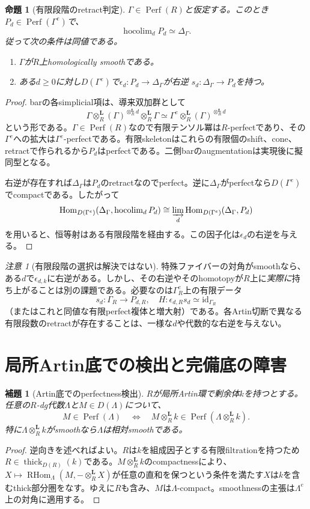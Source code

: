 \documentclass[a4paper,11pt]{ltjsarticle}
\newtheorem{lemma}[theorem]{補題}
\newtheorem{proposition}[theorem]{命題}
\theoremstyle{remark}
\newtheorem{remark}[theorem]{注意}
\newcommand{\Perf}{\operatorname{Perf}}
\newcommand{\RHom}{\operatorname{RHom}}
\newcommand{\thick}{\operatorname{thick}}
\newcommand{\otL}{\otimes^{\mathbf L}}
\begin{document}
\begin{proposition}[有限段階のretract判定]\label{prop:bar}
$\Gamma\in\Perf(R)$と仮定する。このとき$P_d\in\Perf(\Gamma^e)$で、
\[
 \operatorname{hocolim}_{d}P_d\simeq\Delta_\Gamma.
\]
従って次の条件は同値である。
\begin{enumerate}
\item $\Gamma$が$R$上homologically smoothである。
\item ある$d\ge0$に対し$D(\Gamma^e)$で$\epsilon_d:P_d\to\Delta_\Gamma$が右逆
$s_d:\Delta_\Gamma\to P_d$を持つ。
\end{enumerate}
\end{proposition}
\begin{proof}
barの各simplicial項は、導来双加群として
\[
 \Gamma\otL_R(\Gamma)^{\otL_R d}\otL_R\Gamma
 \simeq \Gamma^e\otL_R (\Gamma)^{\otL_R d}
\]
という形である。$\Gamma\in\Perf(R)$なので有限テンソル冪は$R$-perfectであり、その$\Gamma^e$への拡大は$\Gamma^e$-perfectである。有限skeletonはこれらの有限個のshift、cone、retractで作られるから$P_d$はperfectである。二側barのaugmentationは実現後に擬同型となる。

右逆が存在すれば$\Delta_\Gamma$は$P_d$のretractなのでperfect。逆に$\Delta_\Gamma$がperfectなら$D(\Gamma^e)$でcompactである。したがって
\[
 \operatorname{Hom}_{D(\Gamma^e)}
 (\Delta_\Gamma,\operatorname{hocolim}_d P_d)
 \cong \varinjlim_d\operatorname{Hom}_{D(\Gamma^e)}(\Delta_\Gamma,P_d)
\]
を用いると、恒等射はある有限段階を経由する。この因子化は$\epsilon_d$の右逆を与える。
\end{proof}

\begin{remark}[有限段階の選択は解決ではない]\label{rem:lifting}
特殊ファイバーの対角がsmoothなら、ある$d$で$\epsilon_{d,k}$に右逆がある。しかし、その右逆やそのhomotopyが$R$上に\emph{実際に}持ち上がることは別の課題である。必要なのは$\Gamma_R^e$上の有限データ
\[
 s_d:\Gamma_R\longrightarrow P_{d,R},\quad
 H:\epsilon_{d,R}s_d\simeq\mathrm{id}_{\Gamma_R}
\]
（またはこれと同値な有限perfect複体と増大射）である。各Artin切断で異なる有限段数のretractが存在することは、一様な$d$や代数的な右逆を与えない。
\end{remark}

\section{局所Artin底での検出と完備底の障害}
\begin{lemma}[Artin底でのperfectness検出]\label{lem:artin}
$R$が局所Artin環で剰余体$k$を持つとする。任意の$R$-dg代数$\Lambda$と$M\in D(\Lambda)$について、
\[
 M\in\Perf(\Lambda)
 \quad\Longleftrightarrow\quad
 M\otL_Rk\in\Perf(\Lambda\otL_Rk).
\]
特に$\Lambda\otL_Rk$がsmoothなら$\Lambda$は相対smoothである。
\end{lemma}
\begin{proof}
逆向きを述べればよい。$R$は$k$を組成因子とする有限filtrationを持つため$R\in\thick_{D(R)}(k)$である。$M\otL_Rk$のcompactnessにより、$X\mapsto\RHom_\Lambda(M,-\otL_RX)$が任意の直和を保つという条件を満たす$X$は$k$を含むthick部分圏をなす。ゆえに$R$も含み、$M$は$\Lambda$-compact。smoothnessの主張は$\Lambda^e$上の対角に適用する。
\end{proof}
\end{document}
